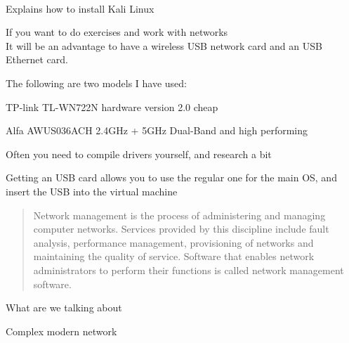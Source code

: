 \documentclass[Screen16to9,17pt]{foils}
\begin{document}
\\
Explains how to install Kali Linux



If you want to do exercises and work with networks \\
It will be an advantage to have a wireless USB network card and an USB Ethernet card.

The following are two models I have used:
\begin{list2}
\item TP-link TL-WN722N hardware version 2.0 cheap
\item Alfa AWUS036ACH 2.4GHz + 5GHz Dual-Band and high performing
\item Often you need to compile drivers yourself, and research a bit
\end{list2}

Getting an USB card allows you to use the regular one for the main OS, and insert the USB into the virtual machine




\begin{quote}
Network management is the process of administering and managing computer networks. Services provided by this discipline include fault analysis, performance management, provisioning of networks and maintaining the quality of service. Software that enables network administrators to perform their functions is called network management software.\\
\end{quote}






\begin{quote}

\end{quote}

\begin{list2}
\item What are we talking about
\item Complex modern network
\end{list2}





\end{document}
